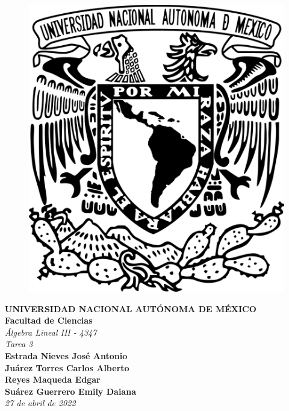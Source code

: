 \begin{center}
    \begin{figure}
        \raggedright
        \includegraphics[scale=0.2]{UNAM.png}
        \label{fig:my_label}
    \end{figure}
    
    \textbf{\Large{UNIVERSIDAD NACIONAL AUTÓNOMA DE MÉXICO}}\\
    \vspace{1cm}
    \textbf{\Large{Facultad de Ciencias}}\\
    \vspace{1cm}
    \textit{\Large{\'Algebra Lineal III - 4347}}\\
    \vspace{1cm}
    \textit{\large{Tarea 3}}\\
    \vspace{1cm}
    \textbf{\large{Estrada Nieves Jos\'e Antonio}}\\
    \vspace{1cm}
    \textbf{\large{Ju\'arez Torres Carlos Alberto}}\\
    \vspace{1cm}
    \textbf{\large{Reyes Maqueda Edgar}}\\
    \vspace{1cm}
    \textbf{\large{Su\'arez Guerrero Emily Daiana}}\\
    \vspace{1cm}
    \textit{\large{27 de abril de 2022}}
    

\end{center}
